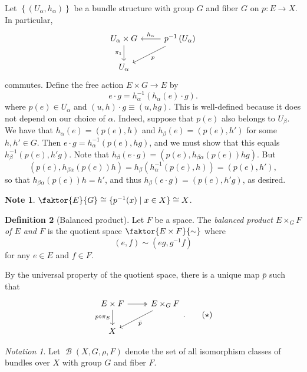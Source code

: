 \documentclass[10pt,letterpaper,cm]{nupset}
\theoremstyle{definition}
\newtheorem{defn}{Definition}[subsection]
\newtheorem{note}[defn]{Note}
\theoremstyle{theorem}
\theoremstyle{remark}
\newtheorem*{notation}{Notation}
\newcommand{\1}{\mathbb{1}}
\newcommand{\0}{\vec 0}
\DeclareMathOperator{\B}{\mathcal{B}}
\begin{document}
Let $\left\{\left(U_{\alpha}, h_{\alpha}\right)\right\}$ be a bundle structure with group $G$ and fiber $G$ on $p: E \to X$. In particular,
\[
\begin{tikzcd}
U_{\alpha}\times G \arrow[d, "\pi_1"'] & p^{-1}\left(U_{\alpha}\right) \arrow[l, "h_{\alpha}"'] \arrow[ld, "p"] \\
U_{\alpha}                             &                                                                                
\end{tikzcd}
\]
commutes. Define the free action $E \times G \to E$ by
\[
e\cdot g = h_{\alpha}^{-1}\left(h_{\alpha}(e)\cdot g\right).
\] where $p(e) \in U_{\alpha}$ and $(u,h) \cdot g \equiv \left(u, hg\right)$. This is well-defined because it does not depend on our choice of $\alpha$. Indeed, suppose that $p(e)$ also belongs to $U_{\beta}$. We have that $h_{\alpha}(e) =\left(p(e), h\right)$ and $h_{\beta}(e) = \left(p(e), h'\right)$ for some $h, h' \in G$. Then $e\cdot g = h_{\alpha}^{-1}\left(p(e), hg\right)$, and we must show that this equals $h_{\beta}^{-1}\left(p(e), h'g\right)$.  Note that $h_{\beta}\left(e\cdot g\right) = \left(p(e), h_{\beta{\alpha}}(p(e))hg\right)$.  But $$\left(p(e), h_{\beta{\alpha}}(p(e))h\right)  =  h_{\beta}\left(h_{\alpha}^{-1}\left(p(e), h\right)\right) = \left(p(e), h'\right),$$ 
so that $h_{\beta{\alpha}}(p(e))h = h'$, and thus $h_{\beta}\left(e\cdot g\right) = \left(p(e), h'g\right)$, as desired.
\begin{note}
$\faktor{E}{G} \cong \{p^{-1}(x) \mid x \in X \} \cong X$.
\end{note}

\begin{defn}[Balanced product]
Let $F$ be a space. The \textit{balanced product $E\times_G F$ of $E$ and $F$} is the quotient space $ \faktor{E\times F}{\sim}$ where $$\left(e, f\right)  \sim \left(eg, g^{-1}f\right)$$
for any $e\in E$ and $f\in F$.
\end{defn}

By the universal property of the quotient space, there is a unique map $\bar{p}$ such that
\[
\begin{tikzcd}
E\times F \arrow[d, "p\circ \pi_E"'] \arrow[r, two heads] & E\times_GF \arrow[ld, "\bar{p}"] \\
X                                                         &                                 
\end{tikzcd}. \label{eq:indmap}  \tag{$\star$}
\]

\begin{notation}
Let $\B\left(X, G, \rho, F\right)$ denote the set of all isomorphism classes of bundles over $X$ with group $G$ and fiber $F$. 
\end{notation}
\end{document}
